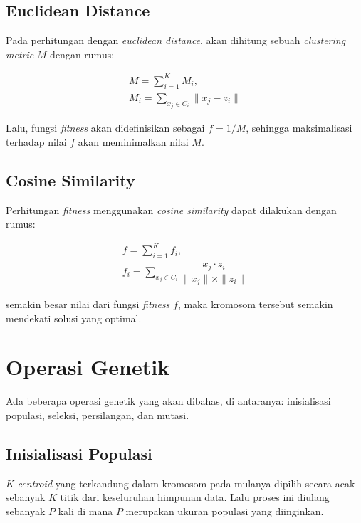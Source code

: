 \subsection{Euclidean Distance}
Pada perhitungan dengan \textit{euclidean distance}, akan dihitung sebuah \textit{clustering metric} $M$ dengan rumus:

\begin{equation}
	\begin{gathered}
	M=\sum_{i=1}^K M_i , \\
	M_i=\sum_{x_j\in C_i}\parallel x_j-z_i\parallel
	\end{gathered}
\end{equation}

Lalu, fungsi \textit{fitness} akan didefinisikan sebagai $f=1/M$, sehingga maksimalisasi terhadap nilai $f$ akan meminimalkan nilai $M$.

\subsection{Cosine Similarity}
Perhitungan \textit{fitness} menggunakan \textit{cosine similarity} dapat dilakukan dengan rumus:

\begin{equation}
	\begin{gathered}
	f=\sum_{i=1}^K f_i , \\
	f_i=\sum_{x_j\in C_i}\dfrac{x_j\cdot z_i}{\parallel x_j \parallel \times \parallel z_i \parallel}
	\end{gathered}
\end{equation}

semakin besar nilai dari fungsi \textit{fitness} $f$, maka kromosom tersebut semakin mendekati solusi yang optimal.

\section{Operasi Genetik}
Ada beberapa operasi genetik yang akan dibahas, di antaranya: inisialisasi populasi, seleksi, persilangan, dan mutasi.

\subsection{Inisialisasi Populasi}
$K$ \textit{centroid} yang terkandung dalam kromosom pada mulanya dipilih secara acak sebanyak $K$ titik dari keseluruhan himpunan data. Lalu proses ini diulang sebanyak $P$ kali di mana $P$ merupakan ukuran populasi yang diinginkan.

